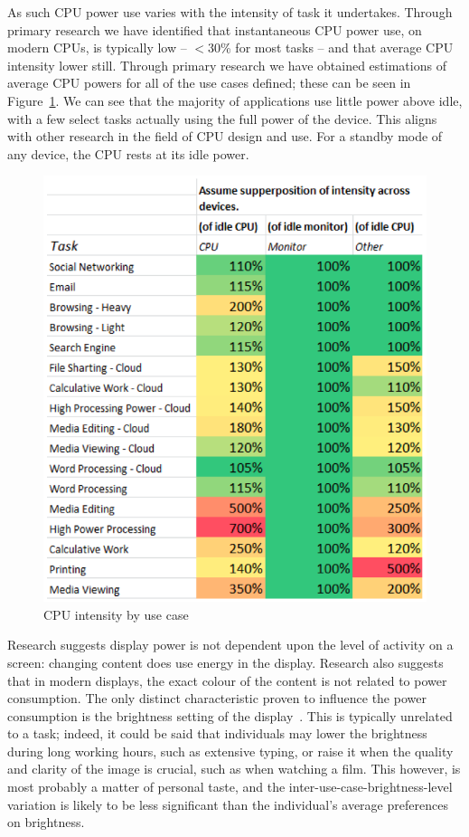 \documentclass[conference]{IEEEtran}
\begin{document}
As such CPU power use varies with the intensity of task it
undertakes. Through primary research we have identified that
instantaneous CPU power use, on modern CPUs, is typically low --
$<$30\% for most tasks -- and that average CPU intensity lower
still. Through primary research we have obtained estimations of
average CPU powers for all of the use cases defined; these can be seen
in Figure~\ref{fig:cpuintensity}. We can see that the majority of
applications use little power above idle, with a few select tasks
actually using the full power of the device. This aligns with other
research in the field of CPU design and use. For a standby mode of any
device, the CPU rests at its idle power.

\begin{figure}[!ht]
\centering
\includegraphics[width=0.9\columnwidth]{images/cpuintensity_usecase.png}
\caption{CPU intensity by use case}
\label{fig:cpuintensity} 
\end{figure}

Research suggests display power is not dependent upon the level of
activity on a screen: changing content does use energy in the
display. Research also suggests that in modern displays, the exact
colour of the content is not related to power consumption. The only
distinct characteristic proven to influence the power consumption is
the brightness setting of the display~\cite{malmodin-et-al:2014}. This
is typically unrelated to a task; indeed, it could be said that
individuals may lower the brightness during long working hours, such
as extensive typing, or raise it when the quality and clarity of the
image is crucial, such as when watching a film. This however, is most
probably a matter of personal taste, and the
inter-use-case-brightness-level variation is likely to be less
significant than the individual’s average preferences on brightness.
\end{document}
